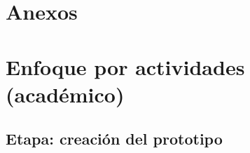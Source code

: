 


\chapter*{Anexos}
\chapter{Enfoque por actividades (académico)}
\label{anexo:actividades_academicas}  %
\section{Etapa: creación del prototipo}

